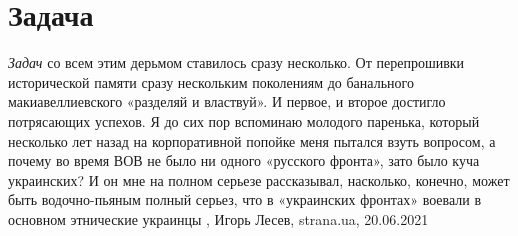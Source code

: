  
 
 
 
 
\chapter{Задача}
\label{sec:slova.zadacha}

\emph{Задач} со всем этим дерьмом ставилось сразу несколько. От перепрошивки
исторической памяти сразу нескольким поколениям до банального макиавеллиевского
«разделяй и властвуй». И первое, и второе достигло потрясающих успехов. Я до
сих пор вспоминаю молодого паренька, который несколько лет назад на
корпоративной попойке меня пытался взуть вопросом, а почему во время ВОВ не
было ни одного «русского фронта», зато было куча украинских? И он мне на полном
серьезе рассказывал, насколько, конечно, может быть водочно-пьяным полный
серьез, что в «украинских фронтах» воевали в основном этнические украинцы
, 
Игорь Лесев, strana.ua, 20.06.2021
